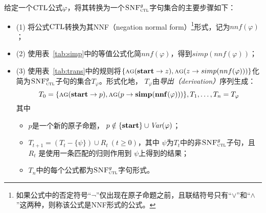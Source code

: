 给定一个$\textrm{CTL}$公式$\varphi$，将其转换为一个${\textsc{SNF}_{\textsc{ctl}}^g}$字句集合的主要步骤如下：
\begin{itemize}
	\item[] (1) 将公式$\textrm{CTL}$转换为其NNF（negation normal form）\footnote{如果公式中的否定符号“$\neg$”仅出现在原子命题之前，且联结符号只有“$\vee$”和“$\wedge$”这两种，则称该公式是NNF形式的公式。}形式，记为$nnf(\varphi)$；
	\item[] (2) 使用表~\ref{tab:simp}中的等值公式化简$nnf(\varphi)$，得到$simp(nnf(\varphi))$；
	\item[] (3) 使用表~\ref{tab:trans}中的规则将$\{\textsc{a}\textsc{g}(\textbf{start}\rightarrow z), \textsc{a}\textsc{g}(z \rightarrow simp(nnf(\varphi)))\}$化简为${\textsc{SNF}_{\textsc{ctl}}^g}$子句的集合$T_{\varphi}$。形式化地，
	$T_\varphi$由\emph{导出（derivation）}序列生成：
	\[ T_0=\{\textsc{a}\textsc{g}(\textbf{start}\rightarrow p), \textsc{a}\textsc{g}(p\rightarrow {\bf simp}({\bf nnf}(\varphi)))\}, T_1, \ldots, T_n=T_\varphi\]
	其中
	\begin{itemize}
		\item $p$是一个新的原子命题， \ie $p\notin \{\textbf{start}\}\cup\textit{Var}(\varphi)$；
		\item $T_{t+1} = (T_t - \{\psi\}) \cup R_t~(t\ge 0)$，其中 $\psi$为$T_t$中的非${\textsc{SNF}_{\textsc{ctl}}^g}$子句，且 $R_t$
	是使用一条匹配的归则作用到 $\psi$上得到的结果；
		\item  $T_n$中的每个公式都为${\textsc{SNF}_{\textsc{ctl}}^g}$字句形式。
	\end{itemize}
\end{itemize}


